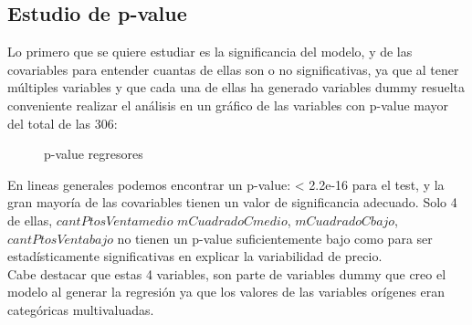 \subsection{Estudio de p-value}

Lo primero que se quiere estudiar es la significancia del modelo, y de las covariables para entender cuantas de ellas son o no significativas, ya que al tener múltiples variables y que cada una de ellas ha generado variables dummy resuelta conveniente realizar el análisis en un gráfico de las variables con p-value mayor del total de las 306:\\



\begin{figure}[h]
\centering
{}%
\caption{p-value regresores}
\label{p-value}
\end{figure}






En lineas generales podemos encontrar un p-value: < 2.2e-16 para el test, y la gran mayoría de las covariables tienen un valor de significancia adecuado.
Solo 4 de ellas, $cantPtosVentamedio$ $mCuadradoCmedio$, $mCuadradoCbajo$, $cantPtosVentabajo$ no tienen un p-value suficientemente bajo como para ser estadísticamente significativas en explicar la variabilidad de precio.\\
Cabe destacar que estas 4 variables, son parte de variables dummy que creo el modelo al generar la regresión ya que los valores de las variables orígenes eran categóricas multivaluadas.




